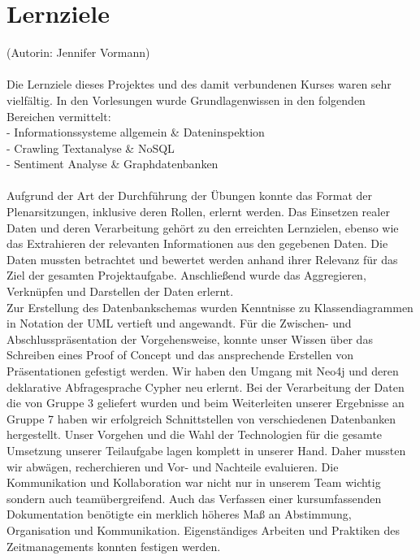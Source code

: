 \section{Lernziele}\label{sec:04_07_lernziele}
(Autorin: Jennifer Vormann)\\
\\
Die Lernziele dieses Projektes und des damit verbundenen Kurses waren sehr vielfältig. In den Vorlesungen wurde Grundlagenwissen in den folgenden Bereichen vermittelt:\\
- Informationssysteme allgemein \& Dateninspektion\\
- Crawling Textanalyse \& NoSQL\\
- Sentiment Analyse \& Graphdatenbanken\\
\\
Aufgrund der Art der Durchführung der Übungen konnte das Format der Plenarsitzungen, inklusive deren Rollen, erlernt werden. Das Einsetzen realer Daten und deren Verarbeitung gehört zu den erreichten Lernzielen, ebenso wie das Extrahieren der relevanten Informationen aus den gegebenen Daten. Die Daten mussten betrachtet und bewertet werden anhand ihrer Relevanz für das Ziel der gesamten Projektaufgabe. Anschließend wurde das Aggregieren, Verknüpfen und Darstellen der Daten erlernt.\\
Zur Erstellung des Datenbankschemas wurden Kenntnisse zu Klassendiagrammen in Notation der UML vertieft und angewandt. Für die Zwischen- und Abschlusspräsentation der Vorgehensweise, konnte unser Wissen über das Schreiben eines Proof of Concept und das ansprechende Erstellen von Präsentationen gefestigt werden. Wir haben den Umgang mit Neo4j und deren deklarative Abfragesprache Cypher neu erlernt. Bei der Verarbeitung der Daten die von Gruppe 3 geliefert wurden und beim Weiterleiten unserer Ergebnisse an Gruppe 7 haben wir erfolgreich Schnittstellen von verschiedenen Datenbanken hergestellt. Unser Vorgehen und die Wahl der Technologien für die gesamte Umsetzung unserer Teilaufgabe lagen komplett in unserer Hand. Daher mussten wir abwägen, recherchieren und Vor- und Nachteile evaluieren. Die Kommunikation und Kollaboration war nicht nur in unserem Team wichtig sondern auch teamübergreifend. Auch das Verfassen einer kursumfassenden Dokumentation benötigte ein merklich höheres Maß an Abstimmung, Organisation und Kommunikation. Eigenständiges Arbeiten und Praktiken des Zeitmanagements konnten festigen werden.
